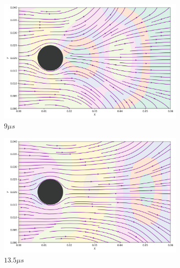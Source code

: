 \begin{figure}[!ht]
    \centering
    \begin{subfigure}{.3\textwidth}
        \centering
        \includegraphics[width=\linewidth]{Figures/cylinder_example_timesteps/streamline01.png}
        \caption{$9 \mu s$}
        \label{fig:sub1}
    \end{subfigure}%
    \begin{subfigure}{.3\textwidth}
        \centering
        \includegraphics[width=\linewidth]{Figures/cylinder_example_timesteps/streamline02.png}
        \caption{$13.5 \mu s$}
        \label{fig:sub2}
    \end{subfigure}
    \begin{subfigure}{.3\textwidth}
        \centering

\end{subfigure}
\end{figure}
